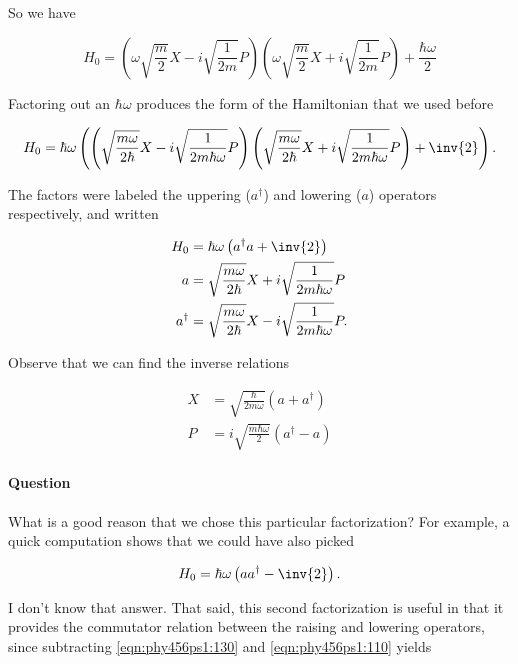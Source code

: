 So we have

\begin{equation}\label{eqn:phy456ps1:70}
H_0 =
\left(\omega \sqrt{\frac{m}{2}} X - i \sqrt{\frac{1}{2m}} P\right)\left(\omega \sqrt{\frac{m}{2}} X + i \sqrt{\frac{1}{2m}} P\right)
+ \frac{\hbar \omega}{2}
\end{equation}

Factoring out an $\hbar \omega$ produces the form of the Hamiltonian that we used before

\begin{equation}\label{eqn:phy456ps1:90}
H_0 =
\hbar \omega \left(
\left(\sqrt{\frac{m \omega}{2 \hbar}} X - i \sqrt{\frac{1}{2m \hbar \omega}} P\right)\left(\sqrt{\frac{m \omega}{2 \hbar}} X + i \sqrt{\frac{1}{2m \hbar \omega}} P\right)
+ \inv{2}
\right)
.
\end{equation}

The factors were labeled the uppering ($a^\dagger$) and lowering ($a$) operators respectively, and written

\begin{align}\label{eqn:phy456ps1:110}
H_0 &= \hbar \omega \left( a^\dagger a + \inv{2} \right) \\
a &= \sqrt{\frac{m \omega}{2 \hbar}} X + i \sqrt{\frac{1}{2m \hbar \omega}} P \\
a^\dagger &= \sqrt{\frac{m \omega}{2 \hbar}} X - i \sqrt{\frac{1}{2m \hbar \omega}} P.
\end{align}

Observe that we can find the inverse relations

\begin{align}\label{eqn:phy456ps1:115}
X &= \sqrt{ \frac{\hbar}{2 m \omega} } \left( a + a^\dagger \right) \\
P &= i \sqrt{ \frac{m \hbar \omega}{2} } \left( a^\dagger  - a \right)
\end{align}

\paragraph{Question}
What is a good reason that we chose this particular factorization?  For example, a quick computation shows that we could have also picked

\begin{equation}\label{eqn:phy456ps1:130}
H_0 = \hbar \omega \left( a a^\dagger - \inv{2} \right).
\end{equation}

I don't know that answer.  That said, this second factorization is useful in that it provides the commutator relation between the raising and lowering operators, since subtracting \ref{eqn:phy456ps1:130} and \ref{eqn:phy456ps1:110} yields

